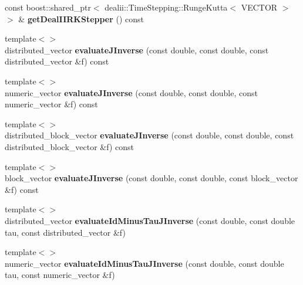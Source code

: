 \begin{DoxyCompactItemize}
\item 
\hypertarget{classnatrium_1_1DealIIWrapper_aa3884302049151f381feeafab93b7862}{
const boost::shared\_\-ptr$<$ dealii::TimeStepping::RungeKutta$<$ VECTOR $>$ $>$ \& {\bfseries getDealIIRKStepper} () const }
\label{classnatrium_1_1DealIIWrapper_aa3884302049151f381feeafab93b7862}

\item 
\hypertarget{classnatrium_1_1DealIIWrapper_ad9f669169c770a15fc9edf5e93030b1f}{
{\footnotesize template$<$$>$ }\\distributed\_\-vector {\bfseries evaluateJInverse} (const double, const double, const distributed\_\-vector \&f) const}
\label{classnatrium_1_1DealIIWrapper_ad9f669169c770a15fc9edf5e93030b1f}

\item 
\hypertarget{classnatrium_1_1DealIIWrapper_a83a7d57a68f35158263bf74c0a4d5aed}{
{\footnotesize template$<$$>$ }\\numeric\_\-vector {\bfseries evaluateJInverse} (const double, const double, const numeric\_\-vector \&f) const}
\label{classnatrium_1_1DealIIWrapper_a83a7d57a68f35158263bf74c0a4d5aed}

\item 
\hypertarget{classnatrium_1_1DealIIWrapper_a43b19df161e01db3b99489877eaf6451}{
{\footnotesize template$<$$>$ }\\distributed\_\-block\_\-vector {\bfseries evaluateJInverse} (const double, const double, const distributed\_\-block\_\-vector \&f) const}
\label{classnatrium_1_1DealIIWrapper_a43b19df161e01db3b99489877eaf6451}

\item 
\hypertarget{classnatrium_1_1DealIIWrapper_a389c33cc682c761e63adb08fd4f68031}{
{\footnotesize template$<$$>$ }\\block\_\-vector {\bfseries evaluateJInverse} (const double, const double, const block\_\-vector \&f) const}
\label{classnatrium_1_1DealIIWrapper_a389c33cc682c761e63adb08fd4f68031}

\item 
\hypertarget{classnatrium_1_1DealIIWrapper_ab0e57073c150e04e063dc621bf9b94f5}{
{\footnotesize template$<$$>$ }\\distributed\_\-vector {\bfseries evaluateIdMinusTauJInverse} (const double, const double tau, const distributed\_\-vector \&f)}
\label{classnatrium_1_1DealIIWrapper_ab0e57073c150e04e063dc621bf9b94f5}

\item 
\hypertarget{classnatrium_1_1DealIIWrapper_a9a50370a5fbdce709aab87a4c38d5247}{
{\footnotesize template$<$$>$ }\\numeric\_\-vector {\bfseries evaluateIdMinusTauJInverse} (const double, const double tau, const numeric\_\-vector \&f)}
\label{classnatrium_1_1DealIIWrapper_a9a50370a5fbdce709aab87a4c38d5247}


\end{DoxyCompactItemize}
